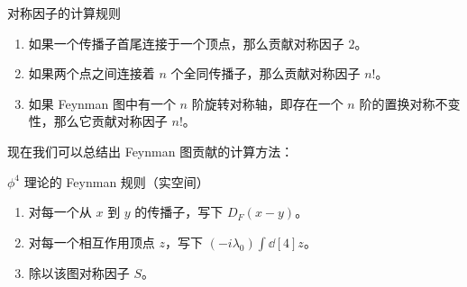 \begin{theorem}{对称因子的计算规则}\label{the_wick_1}
\begin{enumerate}
\item 如果一个传播子首尾连接于一个顶点，那么贡献对称因子 $2$。
\item 如果两个点之间连接着 $n$ 个全同传播子，那么贡献对称因子 $n!$。
\item 如果 Feynman 图中有一个 $n$ 阶旋转对称轴，即存在一个 $n$ 阶的置换对称不变性，那么它贡献对称因子 $n!$。
\end{enumerate}
\end{theorem}
现在我们可以总结出 Feynman 图贡献的计算方法：
\begin{theorem}{$\phi^4$ 理论的 Feynman 规则（实空间）}
\begin{enumerate}
\item 对每一个从 $x$ 到 $y$ 的传播子，写下 $D_F(x-y)$。
\item 对每一个相互作用顶点 $z$，写下 $(-i\lambda_0)\int \dd[4]{z}$。
\item 除以该图对称因子 $S$。
\end{enumerate}
\end{theorem}
